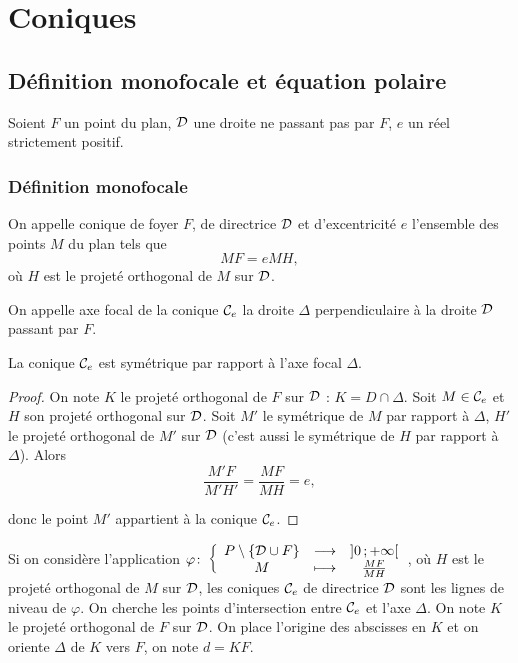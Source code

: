 \chapter{Coniques}
\minitoc
\minilof
\minilot
\section{Définition monofocale et équation polaire}
Soient $F$ un point du plan, $\mathcal{D}$ une droite ne passant pas par $F$, $e$ un réel strictement positif.
\subsection{Définition monofocale}
\begin{defdef}
   On appelle conique de foyer $F$, de directrice $\mathcal{D}$ et d'excentricité $e$ l'ensemble des points $M$ du plan tels que
  \begin{equation}
    MF=e MH,
  \end{equation}
  où $H$ est le projeté orthogonal de $M$ sur $\mathcal{D}$.
\end{defdef}
\begin{defdef}
  On appelle axe focal de la conique $\mathcal{C}_{e}$ la droite $\Delta$ perpendiculaire à la droite $\mathcal{D}$ passant par $F$.
\end{defdef}
\begin{prop}
  La conique $\mathcal{C}_{e}$ est symétrique par rapport à l'axe focal $\Delta$.
\end{prop}
\begin{proof}
  On note $K$ le projeté orthogonal de $F$ sur $\mathcal{D}$ : $K=D \cap \Delta$. Soit $M \in \mathcal{C}_{e}$ et $H$ son projeté orthogonal sur $\mathcal{D}$. Soit $M'$ le symétrique de $M$ par rapport à $\Delta$, $H'$ le projeté orthogonal de $M'$ sur $\mathcal{D}$ (c'est aussi le symétrique de $H$ par rapport à $\Delta$). Alors
\begin{equation}
  \frac{M'F}{M'H'} = \frac{MF}{MH} = e,
\end{equation}

donc le point $M'$ appartient à la conique $\mathcal{C}_{e}$.
\end{proof}
Si on considère l'application $\varphi\colon \left\{\begin{array}{ccc} P\setminus\{\mathcal{D} \cup F\} & \longrightarrow &\left] 0 \, ;  +\infty \right[\\ M & \longmapsto & \frac{MF}{MH} \end{array} \right.$, où $H$ est le projeté orthogonal de $M$ sur $\mathcal{D}$, les coniques $\mathcal{C}_{e}$ de directrice $\mathcal{D}$ sont les lignes de niveau de $\varphi$. On cherche les points d'intersection entre $\mathcal{C}_{e}$ et l'axe $\Delta$. On note $K$ le projeté orthogonal de $F$ sur $\mathcal{D}$. On place l'origine des abscisses en $K$ et on oriente $\Delta$ de $K$ vers $F$, on note $d=KF$.

